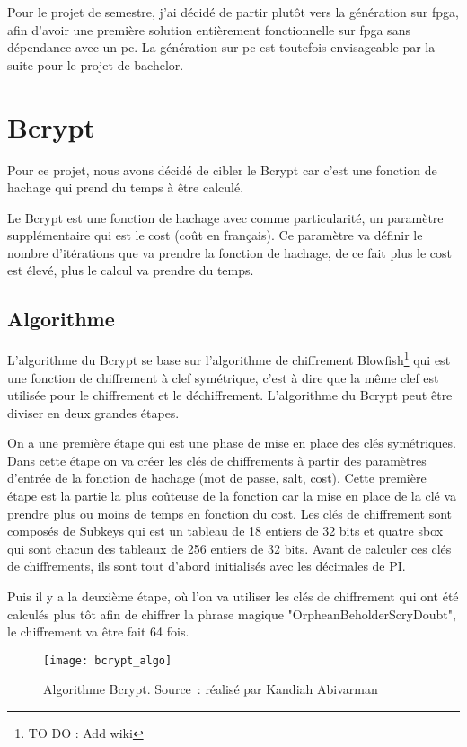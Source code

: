 Pour le projet de semestre, j'ai décidé de partir plutôt vers la génération sur \gls{fpga}, afin d'avoir une première solution entièrement fonctionnelle sur \gls{fpga} sans dépendance avec un \gls{pc}. La génération sur \gls{pc} est toutefois envisageable par la suite pour le projet de bachelor.

\section{Bcrypt}

Pour ce projet, nous avons décidé de cibler le Bcrypt car c'est une fonction de hachage qui prend du temps à être calculé. 

Le Bcrypt est une fonction de hachage avec comme particularité, un paramètre supplémentaire qui est le cost (coût en français). Ce paramètre va définir le nombre d'itérations que va prendre la fonction de hachage, de ce fait plus le cost est élevé, plus le calcul va prendre du temps.

\subsection{Algorithme}

L'algorithme du Bcrypt se base sur l'algorithme de chiffrement Blowfish\footnote{TO DO : Add wiki} qui est une fonction de chiffrement à clef symétrique, c'est à dire que la même clef est utilisée pour le chiffrement et le déchiffrement. L'algorithme du Bcrypt peut être diviser en deux grandes étapes.

On a une première étape qui est une phase de mise en place des clés symétriques. Dans cette étape on va créer les clés de chiffrements à partir des paramètres d'entrée de la fonction de hachage (mot de passe, salt, cost). Cette première étape est la partie la plus coûteuse de la fonction car la mise en place de la clé va prendre plus ou moins de temps en fonction du cost. Les clés de chiffrement sont composés de Subkeys qui est un tableau de 18 entiers de 32 bits et quatre \gls{sbox} qui sont chacun des tableaux de 256 entiers de 32 bits. Avant de calculer ces clés de chiffrements, ils sont tout d'abord initialisés avec les décimales de PI.

Puis il y a la deuxième étape, où l'on va utiliser les clés de chiffrement qui ont été calculés plus tôt afin de chiffrer la phrase magique "OrpheanBeholderScryDoubt", le chiffrement va être fait 64 fois.

\begin{figure}[tbph!]
	\centering
	\texttt{[image: bcrypt\_algo]}
	\caption[Algorithme Bcrypt]{Algorithme Bcrypt. Source : réalisé par Kandiah Abivarman}
	\label{fig:bcrypt_algo}
\end{figure}

